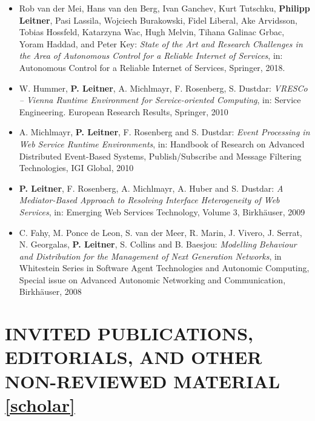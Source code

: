 \documentclass[paper=letter,fontsize=11pt]{scrartcl} %
\newcommand{\NewPart}[2]{\section*{\uppercase{#1} #2}}
\begin{document}
\begin{itemize}
	\item Rob van der Mei, Hans van den Berg, Ivan Ganchev, Kurt Tutschku, \textbf{Philipp Leitner}, Pasi Lassila, Wojciech Burakowski, Fidel Liberal, Ake Arvidsson, Tobias Hossfeld, Katarzyna Wac, Hugh Melvin, Tihana Galinac Grbac, Yoram Haddad, and Peter Key:
	\emph{State of the Art and Research Challenges in the Area of Autonomous Control for a Reliable Internet of Services},
	in: Autonomous Control for a Reliable Internet of Services, Springer, 2018.
\item W. Hummer, \textbf{P. Leitner}, A. Michlmayr, F. Rosenberg, S. Dustdar:
\emph{VRESCo -- Vienna Runtime Environment for Service-oriented Computing},
in: Service Engineering. European Research Results, Springer, 2010
\item A. Michlmayr, \textbf{P. Leitner}, F. Rosenberg and S. Dustdar: \emph{Event
Processing in Web Service Runtime Environments}, in: Handbook of
Research on Advanced Distributed Event-Based Systems, Publish/Subscribe and
Message Filtering Technologies, IGI Global, 2010
\item \textbf{P. Leitner}, F. Rosenberg, A. Michlmayr, A. Huber and S. Dustdar:
\emph{A Mediator-Based Approach to Resolving Interface Heterogeneity of Web
Services}, in: Emerging Web Services Technology, Volume 3,
Birkh\"auser, 2009
\item C. Fahy, M. Ponce de Leon, S. van der Meer, R. Marin, J. Vivero, J. Serrat,
N. Georgalas, \textbf{P. Leitner}, S. Collins and B. Baesjou: \emph{Modelling
Behaviour and Distribution for the Management of Next Generation Networks},
in Whitestein Series in Software Agent Technologies and Autonomic
Computing, Special issue on Advanced Autonomic Networking and Communication,
Birkh\"auser, 2008
\end{itemize}

\NewPart{Invited Publications, Editorials, and Other Non-Reviewed Material}{\href{https://scholar.google.ch/citations?user=wZ9f8CAAAAAJ}{[scholar]}}
\end{document}
